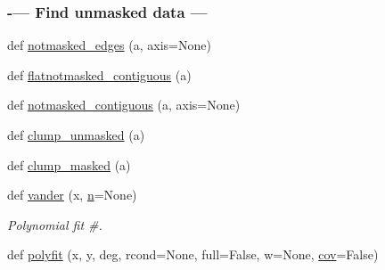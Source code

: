\begin{DoxyCompactItemize}
\begin{DoxyCompactList}
 \subsubsection*{-\/--- Find unmasked data --- }\end{DoxyCompactList}\item 
def \hyperlink{namespacenumpy_1_1ma_1_1extras_a70ecd3b49d812ea251ced5430894f41e}{notmasked\+\_\+edges} (a, axis=None)
\item 
def \hyperlink{namespacenumpy_1_1ma_1_1extras_aa26343936ff8088bc217f4a860d23501}{flatnotmasked\+\_\+contiguous} (a)
\item 
def \hyperlink{namespacenumpy_1_1ma_1_1extras_ad7bbd77e4b1dfc9e82898843eec751da}{notmasked\+\_\+contiguous} (a, axis=None)
\item 
def \hyperlink{namespacenumpy_1_1ma_1_1extras_a248ca8bbe2fe9495fedc3f754849585b}{clump\+\_\+unmasked} (a)
\item 
def \hyperlink{namespacenumpy_1_1ma_1_1extras_ab14418e8e898ae8d4a9e4540d7d896c2}{clump\+\_\+masked} (a)
\item 
def \hyperlink{namespacenumpy_1_1ma_1_1extras_a83f58345cd4c9d4411b20da8cf118c32}{vander} (x, \hyperlink{namespacenumpy_a352663c52853d2754274407d5cae2832}{n}=None)
\begin{DoxyCompactList}\small\item\em Polynomial fit \#. \end{DoxyCompactList}\item 
def \hyperlink{namespacenumpy_1_1ma_1_1extras_ae842a548a3c426def8ede2e254b79152}{polyfit} (x, y, deg, rcond=None, full=False, w=None, \hyperlink{namespacenumpy_1_1ma_1_1extras_a621878d481405c2ed2c0d47fce7e576d}{cov}=False)
\end{DoxyCompactItemize}
